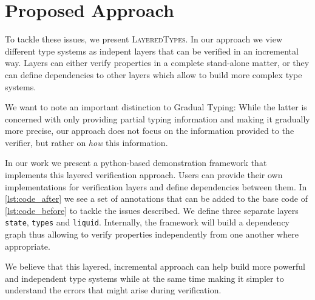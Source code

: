 \documentclass{easychair}
\newcommand{\LayeredTypes}{\textsc{LayeredTypes}}
\begin{document}
\section{Proposed Approach}
\label{sec:proposed-approach}

To tackle these issues, we present \LayeredTypes. In our approach we view different type systems as indepent layers that can be verified in an incremental way. Layers can either verify properties in a complete stand-alone matter, or they can define dependencies to other layers which allow to build more complex type systems.

We want to note an important distinction to Gradual Typing\cite{gradual}\cite{gradual-objects}: While the latter is concerned with only providing partial typing information and making it gradually more precise, our approach does not focus on the information provided to the verifier, but rather on \textit{how} this information.

In our work we present a python-based demonstration framework that implements this layered verification approach. Users can provide their own implementations for verification layers and define dependencies between them. In \autoref{lst:code_after} we see a set of annotations that can be added to the base code of \autoref{lst:code_before} to tackle the issues described. We define three separate layers \texttt{state}, \texttt{types} and \texttt{liquid}. Internally, the framework will build a dependency graph thus allowing to verify properties independently from one another where appropriate.

We believe that this layered, incremental approach can help build more powerful and independent type systems while at the same time making it simpler to understand the errors that might arise during verification.





\end{document}
